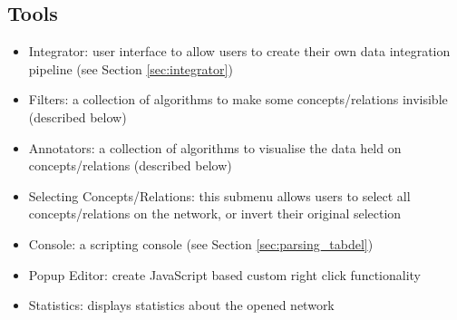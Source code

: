 \subsection{Tools}
\label{sec:menu_tools}
\begin{itemize}
\item Integrator: user interface to allow users to create their own data integration pipeline (see Section \ref{sec:integrator})
\item Filters: a collection of algorithms to make some concepts/relations invisible (described below)
\item Annotators: a collection of algorithms to visualise the data held on concepts/relations (described below)
\item Selecting Concepts/Relations: this submenu allows users to select all concepts/relations on the network, or invert their original selection
\item Console: a scripting console (see Section \ref{sec:parsing_tabdel}) 
\item Popup Editor: create JavaScript based custom right click functionality 
\item Statistics: displays statistics about the opened network
\end{itemize}


